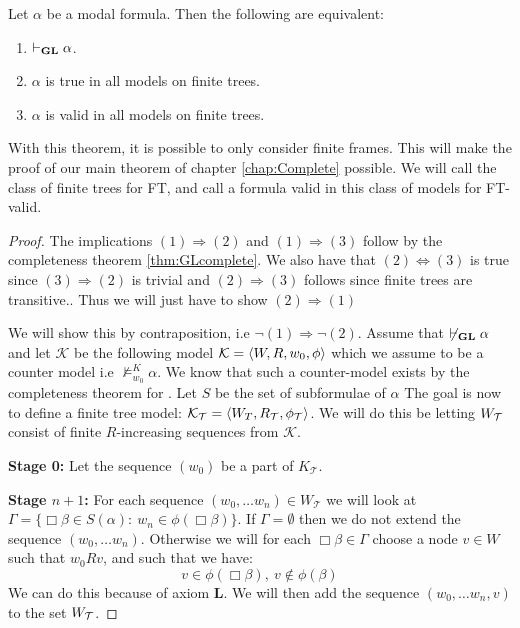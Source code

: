 \documentclass[../main.tex]{subfiles}
\begin{document}
\begin{thm}
	Let $\alpha$ be a modal formula. Then the following are equivalent:
	\begin{enumerate}
		\item $\vdash_{\text{\textbf{GL}}}\alpha$.
		\item $\alpha$ is true in all models on finite trees.
		\item $\alpha$ is valid in all models on finite trees.
	\end{enumerate}
\end{thm}
With this theorem, it is possible to only consider finite frames. This will make
the proof of our main theorem of chapter \ref{chap:Complete} possible. We will
call the class of finite trees for FT, and call a formula valid in this class
of models for FT-valid.
\begin{proof}
	The implications $(1)\Rightarrow (2)$ and $(1)\Rightarrow(3)$ follow
	by the completeness theorem \ref{thm:GLcomplete}. We also have that $(2)\Leftrightarrow (3)$
	is true since $(3)\Rightarrow(2)$ is trivial and $(2)\Rightarrow(3)$
	follows since finite trees  are transitive.. Thus we will just have to show $(2)\Rightarrow(1)$

	We will show this by contraposition, i.e $\neg(1)\Rightarrow\neg(2)$.
	Assume that $\not\vdash_{\text{\textbf{GL}}}\alpha$ and
let $\mathcal{K}$ be the following model $\mathcal{K}=\langle W,R,w_0,\phi\rangle $
which we assume to be  a counter model i.e
	$\not\vDash_{w_0}^{K}\alpha$. We know that such a counter-model
	exists by the completeness theorem for \GL. Let $S$ be the set of subformulae of
	$\alpha$ The goal is now to define a finite tree
	model: $\mathcal{K}_{\mathcal{T}}=\langle
	W_T,R_{\mathcal{T}},\phi_{\mathcal{T}}\rangle$. We will do this be
	letting $W_{\mathcal{T}}$ consist of finite $R$-increasing sequences from
	$\mathcal{K}$.

	\textbf{Stage 0:} Let the sequence $(w_0)$ be a part of
	$K_{\mathcal{T}}$.

	\textbf{Stage $n+1$:} For each sequence $(w_0,\ldots w_n)\in
	W_{\mathcal{T}}$ we
	will look at $\Gamma=\{\Box\beta\in S(\alpha):\
	w_n\in\phi(\Box\beta)\}$.
	If $\Gamma=\emptyset$ then we do not extend the sequence $(w_0,\ldots
	w_n)$. Otherwise we will for each $\Box\beta\in\Gamma$ choose a node
	$v\in W$ such that $w_0Rv$, and such that we have:
	\[v\in\phi(\Box\beta),\ v\not\in\phi(\beta)\]
	We can do this because of axiom \textbf{L}. We will then add the sequence
	$(w_0,\ldots w_n,v)$ to the set $W_{\mathcal{T}}$.


\end{proof}
\end{document}
